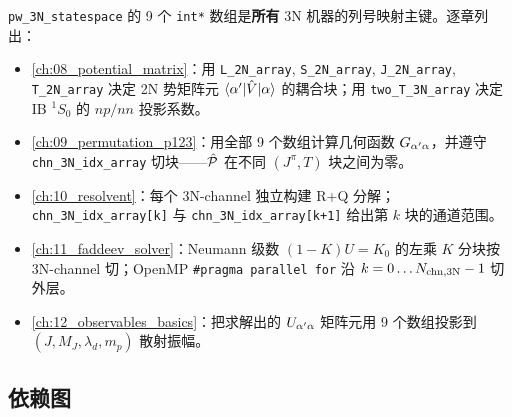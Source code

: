 \texttt{pw\_3N\_statespace} 的 9 个 \texttt{int*} 数组是\textbf{所有} 3N
机器的列号映射主键。逐章列出：

\begin{itemize}
  \item \cref{ch:08_potential_matrix}：用 \texttt{L\_2N\_array}, \texttt{S\_2N\_array},
        \texttt{J\_2N\_array}, \texttt{T\_2N\_array} 决定 2N 势矩阵元
        \(\langle \alpha' | \hat{V} | \alpha \rangle\) 的耦合块；用
        \texttt{two\_T\_3N\_array} 决定 IB \({}^1S_0\) 的 \(np/nn\) 投影系数。
  \item \cref{ch:09_permutation_p123}：用全部 9 个数组计算几何函数
        \(G_{\alpha' \alpha}\)，并遵守 \verb|chn_3N_idx_array| 切块——\(\hat{\mathcal{P}}\)
        在不同 \((J^\pi, T)\) 块之间为零。
  \item \cref{ch:10_resolvent}：每个 3N-channel 独立构建 R+Q 分解；
        \verb|chn_3N_idx_array[k]| 与 \verb|chn_3N_idx_array[k+1]| 给出第 \(k\)
        块的通道范围。
  \item \cref{ch:11_faddeev_solver}：Neumann 级数 \((1 - K)U = K_0\) 的左乘
        \(K\) 分块按 3N-channel 切；OpenMP \verb|#pragma parallel for| 沿
        \(k = 0 \ldots N_{\rm chn,3N} - 1\) 切外层。
  \item \cref{ch:12_observables_basics}：把求解出的 \(U_{\alpha' \alpha}\)
        矩阵元用 9 个数组投影到 \((J, M_J, \lambda_d, m_p)\) 散射振幅。
\end{itemize}

\subsection{依赖图}
\label{subsec:ch07-callgraph}

